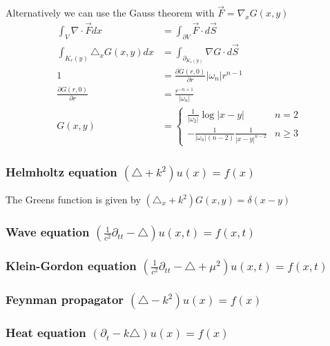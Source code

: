\documentclass[10pt,a4paper]{article}
\theoremstyle{definition}
\begin{document}
Alternatively we can use the Gauss theorem with $\vec{F}=\nabla_x G(x,y)$
\begin{align}
    \int_V \nabla\cdot \vec{F} dx&=\int_{\partial V} \vec{F}\cdot d\vec{S}\\
    \int_{K_r(y)} \triangle_x G(x,y) dx&=\int_{\partial _{K_r(y)}} \nabla G\cdot d\vec{S}\\
    1&=\frac{\partial G(r,0)}{\partial r}|\omega_{n}|r^{n-1}\\
    \frac{\partial G(r,0)}{\partial r} &= \frac{r^{-n+1}}{|\omega_n|}\\
    G(x,y)&=\left\{\begin{array}{cc}
         \frac{1}{|\omega_2|}\log{|x-y|}                    & n=2  \\
         -\frac{1}{|\omega_n|(n-2)}\frac{1}{|x-y|^{n-2}}    & n\ge3 
    \end{array}\right.
\end{align}

\subsubsection{Helmholtz equation \texorpdfstring{$(\triangle +k^2)u(x)= f(x)$}{TEXT}}
The Greens function is given by $(\triangle_x +k^2)G(x,y)=\delta(x-y)$


\subsubsection{Wave equation \texorpdfstring{$\left(\frac{1}{c^2}\partial_{tt}-\triangle\right) u(x,t)= f(x,t)$}{TEXT}}

\subsubsection{Klein-Gordon equation \texorpdfstring{$\left(\frac{1}{c^2}\partial_{tt}-\triangle+\mu^2\right) u(x,t)= f(x,t)$}{TEXT}}


\subsubsection{Feynman propagator \texorpdfstring{$\left(\triangle-k^2\right) u(x)= f(x)$}{TEXT}}

\subsubsection{Heat equation \texorpdfstring{$\left(\partial_{t}-k\triangle\right) u(x)= f(x)$}{TEXT}}
\end{document}
